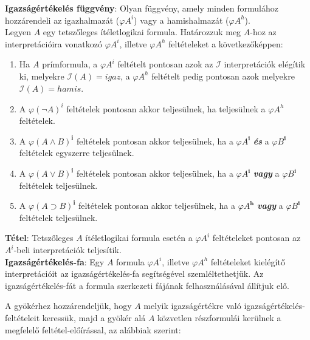 \documentclass[tikz,12pt,margin=0px]{article}
\begin{document}
	\noindent \textbf{Igazságértékelés függvény}:  Olyan függvény, amely minden formulához hozzárendeli az igazhalmazát ($\varphi A^{i}$) vagy
	a hamishalmazát ($\varphi A^{h}$).\\
\newpage
	\noindent Legyen $A$ egy tetszőleges ítéletlogikai formula. Határozzuk meg $A$-hoz az interpretációira vonatkozó $\varphi A^{i}$, illetve
	$\varphi A^{h}$ feltételeket a következőképpen:
	
	\begin{enumerate}
		\item	Ha $A$ prímformula, a $\varphi A^{i}$ feltételt pontosan azok az $\mathcal{I}$ interpretációk elégítik ki,  melyekre
		$\mathcal{I}(A)=igaz$, a $\varphi A^{h}$ feltételt pedig pontosan azok melyekre	$\mathcal{I}(A)=hamis$.
		
		\item	A $\varphi (\neg A)^{i}$ feltételek pontosan akkor teljesülnek, ha teljesülnek a $\varphi A^{h}$ feltételek.
		
		\item	A $\varphi (A \wedge B)^{\textbf{i}}$ feltételek pontosan akkor teljesülnek, ha a $\varphi A^{\textbf{i}}$ \textbf{\emph{és}} a $\varphi B^{\textbf{i}}$ feltételek egyszerre teljesülnek.
		
		\item	A $\varphi (A \vee B)^{\textbf{i}}$ feltételek pontosan akkor teljesülnek, ha a $\varphi A^{\textbf{i}}$ \textbf{\emph{vagy}} a $\varphi B^{\textbf{i}}$ feltételek teljesülnek.
		
		\item	A $\varphi (A \supset B)^{\textbf{i}}$ feltételek pontosan akkor teljesülnek, ha a $\varphi A^{\textbf{h}}$ \textbf{\emph{vagy}} a $\varphi B^{\textbf{i}}$ feltételek teljesülnek.
	\end{enumerate}	
	
	\noindent \textbf{Tétel}: Tetszőleges $A$ ítéletlogikai formula esetén a  $\varphi A^{i}$ feltételeket pontosan az  $A^{i}$-beli
	interpretációk teljesítik.\\

	\noindent \textbf{Igazságértékelés-fa}:  Egy $A$ formula $\varphi A^{i}$, illetve $\varphi A^{h}$ feltételeket kielégítő interpretációit
	az igazságértékelés-fa segítségével szemléltethetjük. Az igazságértékelés-fát a formula szerkezeti fájának felhasználásával állítjuk elő.

    \noindent A gyökérhez hozzárendeljük, hogy $A$ melyik igazságértékre való igazságértékelés-feltételeit keressük, majd a gyökér alá $A$ közvetlen részformulái kerülnek a megfelelő feltétel-előírással, az alábbiak szerint:
\end{document}

